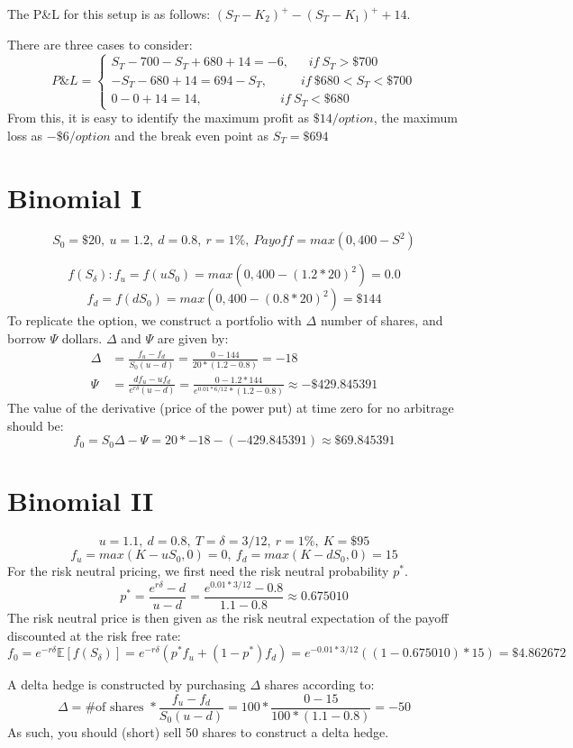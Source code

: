 \documentclass{article}
\begin{document}
The P\&L for this setup is as follows: $(S_T - K_2)^+ - (S_T - K_1)^+ + 14$.

There are three cases to consider:
$$P\&L = \begin{cases} S_T - 700 - S_T + 680 + 14 = -6, \ \ \ \ \ \ \ if \ S_T > \$700 \\ -S_T - 680 + 14 = 694 - S_T, \ \ \ \ \ \ \ \ \ \ \  \ if \ \$680<S_T<\$700 \\ 0 - 0 + 14 = 14, \ \ \ \ \ \ \ \ \ \ \ \ \ \ \ \ \ \ \ \ \ \ \ \ \ \ \ \  if \ S_T < \$680\end{cases}$$
From this, it is easy to identify the maximum profit as $\$14/option$, the maximum loss as $-\$6/option$ and the break even point as $S_T=\$694$

\section{Binomial I}
$$ S_0 = \$20, \ u = 1.2, \ d = 0.8, \ r=1\%, \ Payoff = max(0, 400 - S^2)$$

$$f(S_{\delta}): f_u = f(uS_0) = max(0, 400 - (1.2*20)^2) = 0.0$$
$$f_d = f(dS_0) = max(0, 400 - (0.8*20)^2) = \$144$$
To replicate the option, we construct a portfolio with $\Delta$ number of shares, and borrow $\Psi$ dollars. $\Delta$ and $\Psi$ are given by:
\begin{align*}
	\Delta &= \frac{f_u - f_d}{S_0 (u -d)} = \frac{0 - 144}{20 * (1.2 - 0.8)} = -18 \\
	\Psi &= \frac{df_u - uf_d}{e^{r\delta}(u-d)} = \frac{0 - 1.2 * 144}{e^{0.01 * 6/12} * (1.2-0.8)} \approx -\$429.845391
\end{align*}
The value of the derivative (price of the power put) at time zero for no arbitrage should be:
$$f_0 = S_0\Delta - \Psi = 20*-18 - (-429.845391) \approx \$69.845391 $$

\section{Binomial II}
$$u = 1.1, \ d = 0.8, \ T=\delta=3/12, \ r = 1\%, \ K = \$95$$
$$f_u = max(K - uS_0, 0) = 0, \ f_d = max(K - dS_0, 0) = 15$$
For the risk neutral pricing, we first need the risk neutral probability $p^*$.
$$p^* = \frac{e^{r\delta} - d}{u - d} = \frac{e^{0.01 * 3/12}-0.8}{1.1-0.8} \approx 0.675010$$
The risk neutral price is then given as the risk neutral expectation of the payoff discounted at the risk free rate:
$$f_0 = e^{-r\delta}\mathbb{E}[f(S_{\delta})] = e^{-r\delta}\left(p^*f_u + (1-p^*)f_d\right) = e^{-0.01*3/12}\left((1-0.675010)*15\right) = \$4.862672$$

A delta hedge is constructed by purchasing $\Delta$ shares according to:
$$\Delta = \text{\# of shares } * \frac{f_u-f_d}{S_0(u-d)} = 100 * \frac{0 - 15}{100 * (1.1 - 0.8)} = -50$$
As such, you should (short) sell 50 shares to construct a delta hedge.
\end{document}
